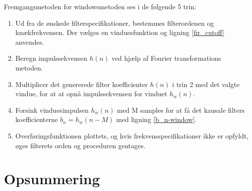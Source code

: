 Fremgangsmetoden for windowsmetoden ses i de følgende 5 trin:
\begin{enumerate}
	\item Ud fra de ønskede filterspecifikationer, bestemmes filterordenen og knækfrekvensen. Der vælges en vinduesfunktion og ligning \ref{fir_cutoff} anvendes.
	\item Beregn impulssekvensen $h(n)$ ved hjælp af Fourier transformations metoden.
	\item Multiplicer det genererede filter koefficienter $h(n)$ i trin 2 med det valgte vindue, for at at opnå impulssekvensen for vinduet $h_w(n)$.
	\item Forsink vinduesimpulsen $h_w(n)$ med M samples for at få det kausale filters koefficienterne $b_n = h_w(n-M)$ med ligning \ref{b_n-window}.
	\item Overføringsfunktionen plottets, og hvis frekvensspecifikationer ikke er opfyldt, øges filterets orden og proceduren gentages.
\end{enumerate}


\section{Opsummering}

